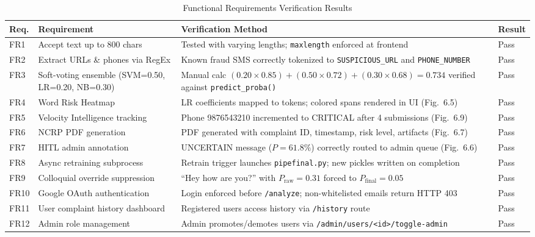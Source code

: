 \begin{table}[H]
    \centering
    \caption{Functional Requirements Verification Results}
    \label{tab:fr_verification}
    \footnotesize
    \begin{tabular}{|l|p{3.2cm}|p{7.5cm}|l|}
    \hline
    \textbf{Req.} & \textbf{Requirement} & \textbf{Verification Method} & \textbf{Result} \\ \hline
    FR1  & Accept text up to 800 chars          & Tested with varying lengths; \texttt{maxlength} enforced at frontend & Pass \\ \hline
    FR2  & Extract URLs \& phones via RegEx      & Known fraud SMS correctly tokenized to \texttt{SUSPICIOUS\_URL} and \texttt{PHONE\_NUMBER} & Pass \\ \hline
    FR3  & Soft-voting ensemble (SVM=0.50, LR=0.20, NB=0.30) & Manual calc $(0.20{\times}0.85)+(0.50{\times}0.72)+(0.30{\times}0.68)=0.734$ verified against \texttt{predict\_proba()} & Pass \\ \hline
    FR4  & Word Risk Heatmap                     & LR coefficients mapped to tokens; colored spans rendered in UI (Fig.~6.5) & Pass \\ \hline
    FR5  & Velocity Intelligence tracking        & Phone 9876543210 incremented to CRITICAL after 4 submissions (Fig.~6.9) & Pass \\ \hline
    FR6  & NCRP PDF generation                   & PDF generated with complaint ID, timestamp, risk level, artifacts (Fig.~6.7) & Pass \\ \hline
    FR7  & HITL admin annotation                 & UNCERTAIN message ($P=61.8\%$) correctly routed to admin queue (Fig.~6.6) & Pass \\ \hline
    FR8  & Async retraining subprocess           & Retrain trigger launches \texttt{pipefinal.py}; new pickles written on completion & Pass \\ \hline
    FR9  & Colloquial override suppression       & ``Hey how are you?'' with $P_{\text{raw}}=0.31$ forced to $P_{\text{final}}=0.05$ & Pass \\ \hline
    FR10 & Google OAuth authentication           & Login enforced before \texttt{/analyze}; non-whitelisted emails return HTTP 403 & Pass \\ \hline
    FR11 & User complaint history dashboard      & Registered users access history via \texttt{/history} route & Pass \\ \hline
    FR12 & Admin role management                 & Admin promotes/demotes users via \texttt{/admin/users/<id>/toggle-admin} & Pass \\ \hline
    \end{tabular}
\end{table}


